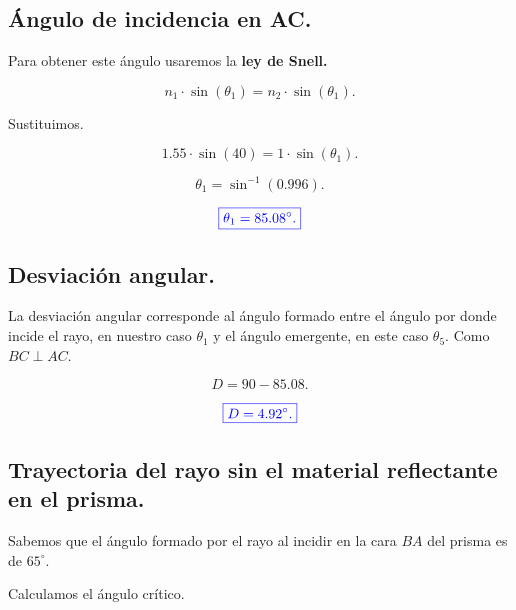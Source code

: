 \documentclass[a4paper,12pt]{article} %
\begin{document}
\subsection{Ángulo de incidencia en AC.}

\begin{justify}
	Para obtener este ángulo usaremos la \textbf{ley de Snell.}
\end{justify}

\[ n_1 \cdot \sin(\theta_1) = n_2 \cdot \sin(\theta_1). \]

\begin{justify}
	Sustituimos.
\end{justify}

\[ 1.55 \cdot \sin(40) = 1 \cdot \sin(\theta_1). \]

\[ \theta_1 = \sin^{-1}(0.996). \]

\vspace{\baselineskip}

\[ \textcolor{blue}{\boxed{\theta_1 = 85.08^\circ.}} \]

\vspace{\baselineskip}

\subsection{Desviación angular.}

\begin{justify}
	La desviación angular corresponde al ángulo formado entre el ángulo por donde incide el rayo, en nuestro caso \(\theta_1\) y el ángulo emergente, en este caso \(\theta_5\). Como \(BC \perp AC\).
\end{justify}

\[ D = 90 - 85.08.\]

\[\textcolor{blue}{\boxed{D = 4.92^\circ.}}\]

\vspace{\baselineskip}

\subsection{Trayectoria del rayo sin el material reflectante en el prisma.}

\begin{justify}
	Sabemos que el ángulo formado por el rayo al incidir en la cara \(BA\) del prisma es de \(65^\circ\). 
\end{justify}

\begin{justify}
	Calculamos el ángulo crítico.
\end{justify}
\end{document}
